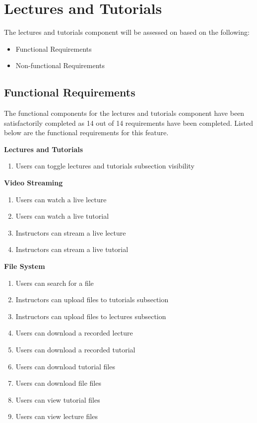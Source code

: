 \section{Lectures and Tutorials}
The lectures and tutorials component will be assessed on based on the following:

\begin{itemize}
    \item Functional Requirements
    \item Non-functional Requirements
\end{itemize}

\subsection{Functional Requirements}
The functional components for the lectures and tutorials component have been satisfactorily completed as 14 out of 14 requirements have been completed. Listed below are the functional requirements for this feature.

\textbf{Lectures and Tutorials}
    \begin{enumerate}
    \item Users can toggle lectures and tutorials subsection visibility
    \end{enumerate}

\textbf{Video Streaming}
    \begin{enumerate}
    \item Users can watch a live lecture
    \item Users can watch a live tutorial
    \item Instructors can stream a live lecture
    \item Instructors can stream a live tutorial
    \end{enumerate}

\textbf{File System}
    \begin{enumerate}
    \item Users can search for a file
    \item Instructors can upload files to tutorials subsection
    \item Instructors can upload files to lectures subsection
    \item Users can download a recorded lecture
    \item Users can download a recorded tutorial
    \item Users can download tutorial files
    \item Users can download file files
    \item Users can view tutorial files
    \item Users can view lecture files
    \end{enumerate}

